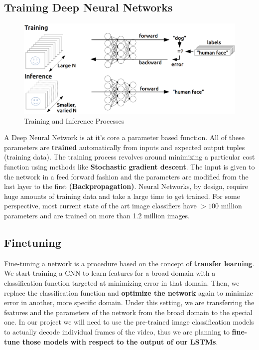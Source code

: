 \documentclass[11pt]{article}
\begin{document}
			\subsection{Training Deep Neural Networks}
					\begin{figure}[ht!]
					\includegraphics[width=14cm]{training_inference1.png}
					\caption{Training and Inference Processes\label{fig5}}
				\end{figure}
				A Deep Neural Network is at it's core a parameter based function. All of these parameters are  \textbf{trained} automatically from inputs and expected output tuples (training data). The training process revolves around minimizing a particular cost function using methods like \textbf{Stochastic gradient descent}. The input is given to the network in a feed forward fashion and the parameters are modified from the last layer to the first \textbf{(Backpropagation)}. Neural Networks, by design, require huge amounts of training data and take a large time to get trained. For some perspective, most current state of the art image classifiers have $> 100$ million parameters and are trained on more than 1.2 million images. 


			\subsection{Finetuning}
				Fine-tuning a network is a procedure based on the concept of
				\textbf{transfer learning}. We start training a CNN to learn features for a broad domain with a
				classification function targeted at minimizing error in that domain. Then, we
				replace the classification function and \textbf{optimize the network} again to minimize
				error in another, more specific domain. Under this setting, we are transferring
				the features and the parameters of the network from the broad domain to the
				special one.\cite{fineplant} In our project we will need to use the pre-trained image classification models 
				to actually decode individual frames of the video, thus we are planning to \textbf{fine-tune those models
				with respect to the output of our LSTMs}.
\end{document}

